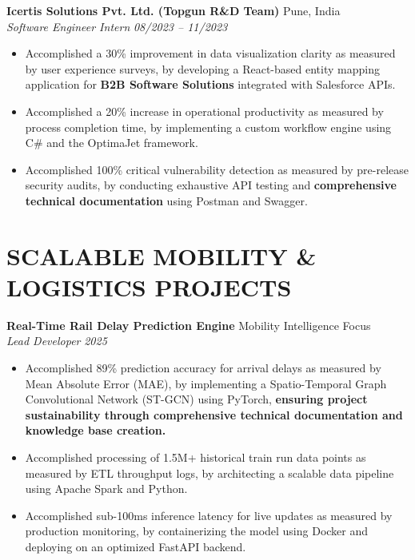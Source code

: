 \documentclass[10pt, a4paper]{article}
\newcommand{\entry}[4]{
  \noindent \textbf{#1} \hfill #2 \\
  \textit{#3} \hfill \textit{#4} \par
  \vspace{2pt}
}
\begin{document}
\entry{Icertis Solutions Pvt. Ltd. (Topgun R\&D Team)}{Pune, India}{Software Engineer Intern}{08/2023 -- 11/2023}
\begin{itemize}[leftmargin=1.5em, noitemsep]
    \item Accomplished a 30\% improvement in data visualization clarity as measured by user experience surveys, by developing a React-based entity mapping application for \textbf{B2B Software Solutions} integrated with Salesforce APIs.
    \item Accomplished a 20\% increase in operational productivity as measured by process completion time, by implementing a custom workflow engine using C\# and the OptimaJet framework.
    \item Accomplished 100\% critical vulnerability detection as measured by pre-release security audits, by conducting exhaustive API testing and \textbf{comprehensive technical documentation} using Postman and Swagger.
\end{itemize}

\section{SCALABLE MOBILITY \& LOGISTICS PROJECTS}

\entry{Real-Time Rail Delay Prediction Engine}{Mobility Intelligence Focus}{Lead Developer}{2025}
\begin{itemize}[leftmargin=1.5em, noitemsep]
    \item Accomplished 89\% prediction accuracy for arrival delays as measured by Mean Absolute Error (MAE), by implementing a Spatio-Temporal Graph Convolutional Network (ST-GCN) using PyTorch, \textbf{ensuring project sustainability through comprehensive technical documentation and knowledge base creation.}
    \item Accomplished processing of 1.5M+ historical train run data points as measured by ETL throughput logs, by architecting a scalable data pipeline using Apache Spark and Python.
    \item Accomplished sub-100ms inference latency for live updates as measured by production monitoring, by containerizing the model using Docker and deploying on an optimized FastAPI backend.
\end{itemize}
\end{document}

